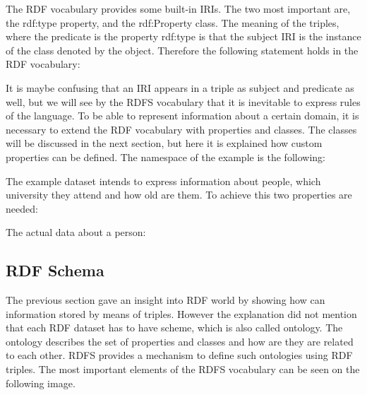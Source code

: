 
The RDF vocabulary provides some built-in IRIs. The two most important are, the rdf:type property, and the rdf:Property class. The meaning of the triples, where the predicate is the property rdf:type  is that the subject IRI is the instance of the class denoted by the object. Therefore the following statement holds in the RDF vocabulary:


It is maybe confusing that an IRI appears in a triple as subject and predicate as well, but we will see by the RDFS vocabulary that it is inevitable to express rules of the language.  
To be able to represent information about a certain domain, it is necessary to extend the RDF vocabulary with properties and classes. The classes will be discussed in the next section, but here it is explained how custom properties can be defined. The namespace of the example is the following: 



The example dataset intends to express information about people, which university they attend and how old are them. To achieve this two properties are needed:



The actual data about a person:



\subsection{RDF Schema}


The previous section gave an insight into RDF world by showing how can information stored by means of triples. However the explanation did not mention that each RDF dataset has to have scheme, which is also called ontology. The ontology describes the set of properties and classes and how are they are related to each other. RDFS provides a mechanism to define such ontologies using RDF triples. The most important elements of the RDFS vocabulary can be seen on the following image. 


